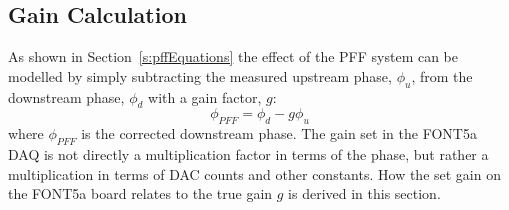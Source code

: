 



\subsection{Gain Calculation}
\label{ss:fontGain}

As shown in Section~\ref{s:pffEquations} the effect of the PFF system can be modelled by simply subtracting the measured upstream phase, \(\phi_u\), from the downstream phase, \(\phi_d\) with a gain factor, \(g\):
\begin{equation} \label{e:realGainEqn}
\phi_{PFF} = \phi_d - g\phi_u
\end{equation}
where \(\phi_{PFF}\) is the corrected downstream phase. The gain set in the FONT5a DAQ is not directly a multiplication factor in terms of the phase, but rather a multiplication in terms of DAC counts and other constants. How the set gain on the FONT5a board relates to the true gain \(g\) is derived in this section.

